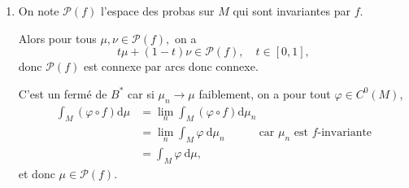 \documentclass[a4paper,12pt,openany]{article}
\theoremstyle{plain}
\theoremstyle{definition}
\newcommand{\dd}{\mathrm{d}}
\newcommand{\Pcal}{\mathcal{P}}
\begin{document}
\begin{enumerate}
Soit $(L_n)$ une suite de $B^*$. On se donne $(f_i) \subset E$ une suite dense de $E$. Alors $(L_n(f_i))_n$ est born\'ee pour tout $i$.



Par un proc\'ed\'e d'extraction diagonale, il existe $(n_k)$ telle que $L_{n_k}(f_i) \to g_i \overset{\mathrm{not}}{=} L(f_i)$ pour tout $i$ quand $k \to +\infty.$



Soit maintenant $f \in E$ et $\varepsilon > 0$.  On a, si $\|f-f_i\| \leqslant \varepsilon,$
$$
\begin{aligned}
\left|L_{n_k}(f) - L_{n_{\ell}}(f)\right| &\leqslant \left|L_{n_k}(f) - L_{n_k}(f_i)\right| + \left|L_{n_k}(f_i) - L_{n_\ell}(f_i)\right|  \\
& \hspace{5cm}+ \left|L_{n_\ell}(f_i) - L_{n_\ell}(f)\right|  \\
& \leqslant 2 \varepsilon + |L_{n_k}(f_i) - L_{n_\ell}(f_i)|.
\end{aligned}
$$

Ainsi, si $k,\ell$ sont assez grands, on a, puisque $L_{n_k}(f_i) \to L(f_i)$,
$$
\left|L_{n_k}(f) - L_{n_{\ell}}(f)\right| \leqslant 3 \varepsilon.
$$

Ainsi $(L_{n_k}(f))_k$ est de Cauchy et donc converge, vers un r\'eel not\'e $L(f).$




L'application $L$ est \'evidemment lin\'eaire et elle v\'erifie $|L(f)|Ê\leqslant  \lim_k |L_{n_k}(f)|Ê\leqslant \|f\|$, ce qui montre que $L \in B^*.$ Ainsi $B^*$ est compacte.


\item On note $\Pcal(f)$ l'espace des probas sur $M$ qui sont invariantes par $f$. 



Alors pour tous $\mu, \nu \in \Pcal(f),$ on a 
$$
t\mu + (1-t) \nu \in \Pcal(f), \quad t \in [0,1],
$$
donc $\Pcal(f)$ est connexe par arcs donc connexe.



C'est un ferm\'e de $B^*$ car si $\mu_n \to \mu$ faiblement, on a pour tout $\varphi \in C^0(M)$,
$$
\begin{aligned}
\int_M (\varphi \circ f) \dd \mu &= \lim_n \int_M (\varphi \circ f) \dd \mu_n  \\
&= \lim_n \int_M \varphi~ \dd \mu_n \quad \quad \quad \text{car $\mu_n$ est $f$-invariante}  \\
&= \int_M \varphi~ \dd \mu,
\end{aligned}
$$
et donc $\mu \in \Pcal(f).$







\end{enumerate}
\end{document}
